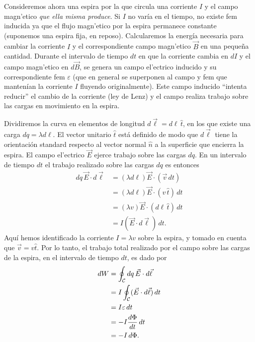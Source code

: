 Consideremos ahora una espira por la que circula una corriente $I$ y el campo magn'etico \textit{que ella misma produce}. Si $I$ no varía en el tiempo, no existe fem inducida ya que el flujo magn'etico por la espira permanece constante (suponemos una espira fija, en reposo). Calcularemos la energía necesaria para cambiar la corriente $I$ y el correspondiente campo magn'etico $\vec{B}$ en una pequeña cantidad. Durante el intervalo de tiempo $dt$ en que la corriente cambia en $dI$ y el campo magn'etico en $d\vec{B}$, se genera un campo el'ectrico inducido y su correspondiente fem $\varepsilon$ (que en general se superponen al campo y fem que mantenían la corriente $I$ fluyendo originalmente). Este campo inducido ``intenta reducir'' el cambio de la corriente (ley de Lenz) y el campo realiza trabajo sobre las cargas en movimiento en la espira. 

Dividiremos la curva en elementos de longitud $d\vec{\ell}=d\ell \,\hat{t}$, en los que existe una carga $dq=\lambda d\ell$. El vector unitario $\hat{t}$ está definido de modo que $d\vec{\ell}$ tiene la orientación standard respecto al vector normal $\hat{n}$ a la superficie que encierra la espira. El campo el'ectrico $\vec{E}$ ejerce trabajo sobre las cargas $dq$. En un intervalo de tiempo $dt$ el trabajo realizado sobre las cargas $dq$ es entonces 
\begin{align}
dq\,\vec{E}\cdot d\vec{\ell} &= (\lambda d\ell) \vec{E}\cdot (\vec{v}\,dt) \\
&= (\lambda d\ell) \vec{E}\cdot (v\,\hat{t})\,dt \\
&= (\lambda v) \vec{E}\cdot (d\ell\,\hat{t})\,dt \\
&= I(\vec{E}\cdot d\vec{\ell})\,dt.
\end{align}
Aquí hemos identificado la corriente $I=\lambda v$ sobre la espira, y tomado en cuenta que $\vec{v}=v\hat{t}$. Por lo tanto, el trabajo total realizado por el campo sobre las cargas de la espira, en el intervalo de tiempo $dt$, es dado por
\begin{align}
dW &= \oint_{\cal C}dq\,\vec{E}\cdot d\vec{\ell} \\
&= I\oint_{\cal C}(\vec{E}\cdot d\vec{\ell})\,dt \\
&= I\varepsilon\,dt \\
&= -I\frac{d\Phi}{dt}\,dt \\
&= -I\,d\Phi.
\end{align}

